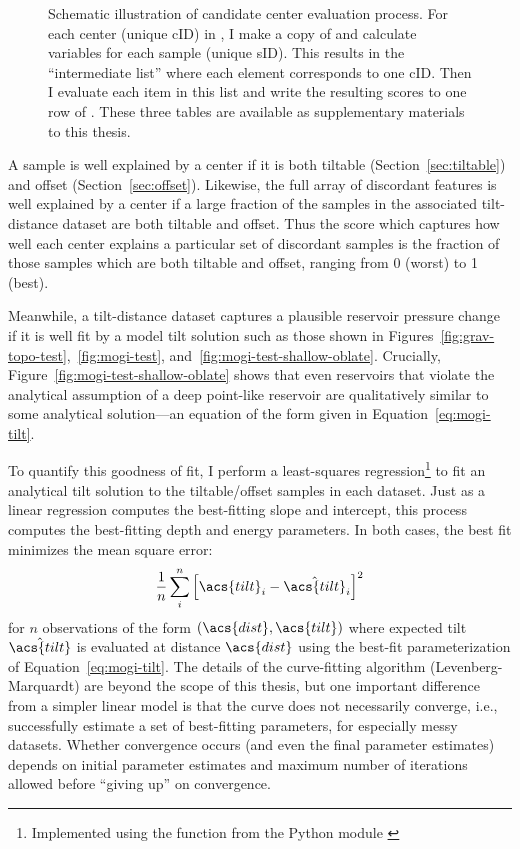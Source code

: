 \begin{figure}
    \caption[Center evaluation process]{Schematic illustration of candidate center evaluation process. For each center (unique cID) in , I make a copy of  and calculate variables for each sample (unique sID). This results in the ``intermediate list'' where each element corresponds to one cID. Then I evaluate each item in this list and write the resulting scores to one row of . These three tables are available as supplementary materials to this thesis.}%
    \label{fig:eval-model}
\end{figure}

A sample is well explained by a center if it is both tiltable (Section~\ref{sec:tiltable}) and offset (Section~\ref{sec:offset}). Likewise, the full array of discordant features is well explained by a center if a large fraction of the samples in the associated tilt-distance dataset are both tiltable and offset. Thus the score which captures how well each center explains a particular set of discordant samples is the fraction of those samples which are both tiltable and offset, ranging from 0 (worst) to 1 (best).

Meanwhile, a tilt-distance dataset captures a plausible reservoir pressure change if it is well fit by a model tilt solution such as those shown in Figures~\ref{fig:grav-topo-test},~\ref{fig:mogi-test}, and~\ref{fig:mogi-test-shallow-oblate}. Crucially, Figure~\ref{fig:mogi-test-shallow-oblate} shows that even reservoirs that violate the analytical assumption of a deep point-like reservoir are qualitatively similar to some analytical solution---an equation of the form given in Equation~\eqref{eq:mogi-tilt}.

To quantify this goodness of fit, I perform a least-squares regression\footnote{Implemented using the  function from the  Python module \parencite{2020SciPy-NMeth}} to fit an analytical tilt solution to the tiltable/offset samples in each dataset. Just as a linear regression computes the best-fitting slope and intercept, this process computes the best-fitting depth and energy parameters. In both cases, the best fit minimizes the mean square error:
\begin{equation}
    \frac{1}{n}\sum_{i}^{n}{\left[\acs{tilt}_i-\hat{\acs{tilt}}_i\right]}^2\label{eq:mse}
\end{equation}
for $n$ observations of the form $(\acs{dist}, \acs{tilt})$ where expected tilt $\hat{\acs{tilt}}$ is evaluated at distance $\acs{dist}$ using the best-fit parameterization of Equation~\eqref{eq:mogi-tilt}. The details of the curve-fitting algorithm (Levenberg-Marquardt) are beyond the scope of this thesis, but one important difference from a simpler linear model is that the curve does not necessarily converge, i.e., successfully estimate a set of best-fitting parameters, for especially messy datasets. Whether convergence occurs (and even the final parameter estimates) depends on initial parameter estimates and maximum number of iterations allowed before ``giving up'' on convergence.

